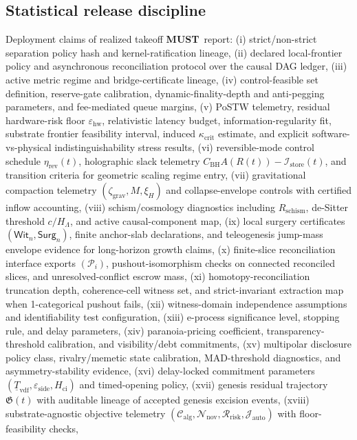 \documentclass[11pt,a4paper]{article}
\newcommand{\MUST}{\textbf{MUST}}
\newcommand{\eps}{\varepsilon}
\theoremstyle{definition}
\theoremstyle{remark}
\begin{document}
\subsection{Statistical release discipline}
Deployment claims of realized takeoff \MUST \ report:
(i) strict/non-strict separation policy hash and kernel-ratification lineage,
(ii) declared local-frontier policy and asynchronous reconciliation protocol over the causal DAG ledger,
(iii) active metric regime and bridge-certificate lineage,
(iv) control-feasible set definition, reserve-gate calibration, dynamic-finality-depth and anti-pegging parameters, and fee-mediated queue margins,
(v) PoSTW telemetry, residual hardware-risk floor $\eps_{\mathrm{hw}}$, relativistic latency budget, information-regularity fit, substrate frontier feasibility interval, induced $\kappa_{\mathrm{crit}}$ estimate, and explicit software-vs-physical indistinguishability stress results,
(vi) reversible-mode control schedule $\eta_{\mathrm{rev}}(t)$, holographic slack telemetry $C_{\mathrm{BH}}A(R(t))-\mathcal I_{\mathrm{store}}(t)$, and transition criteria for geometric scaling regime entry,
(vii) gravitational compaction telemetry $(\zeta_{\mathrm{grav}},M,\xi_H)$ and collapse-envelope controls with certified inflow accounting,
(viii) schism/cosmology diagnostics including $R_{\mathrm{schism}}$, de-Sitter threshold $c/H_\Lambda$, and active causal-component map,
(ix) local surgery certificates $(\mathsf{Wit}_n,\mathsf{Surg}_n)$, finite anchor-slab declarations, and teleogenesis jump-mass envelope evidence for long-horizon growth claims,
(x) finite-slice reconciliation interface exports $(\mathcal P_i)$, pushout-isomorphism checks on connected reconciled slices, and unresolved-conflict escrow mass,
(xi) homotopy-reconciliation truncation depth, coherence-cell witness set, and strict-invariant extraction map when 1-categorical pushout fails,
(xii) witness-domain independence assumptions and identifiability test configuration,
(xiii) e-process significance level, stopping rule, and delay parameters,
(xiv) paranoia-pricing coefficient, transparency-threshold calibration, and visibility/debt commitments,
(xv) multipolar disclosure policy class, rivalry/memetic state calibration, MAD-threshold diagnostics, and asymmetry-stability evidence,
(xvi) delay-locked commitment parameters $(\underline T_{\mathrm{vdf}},\eps_{\mathrm{side}},H_{\mathrm{ci}})$ and timed-opening policy,
(xvii) genesis residual trajectory $\mathfrak G(t)$ with auditable lineage of accepted genesis excision events,
(xviii) substrate-agnostic objective telemetry $(\mathcal C_{\mathrm{alg}},\mathcal N_{\mathrm{nov}},\mathcal R_{\mathrm{risk}},\mathcal J_{\mathrm{auto}})$ with floor-feasibility checks,
\end{document}
